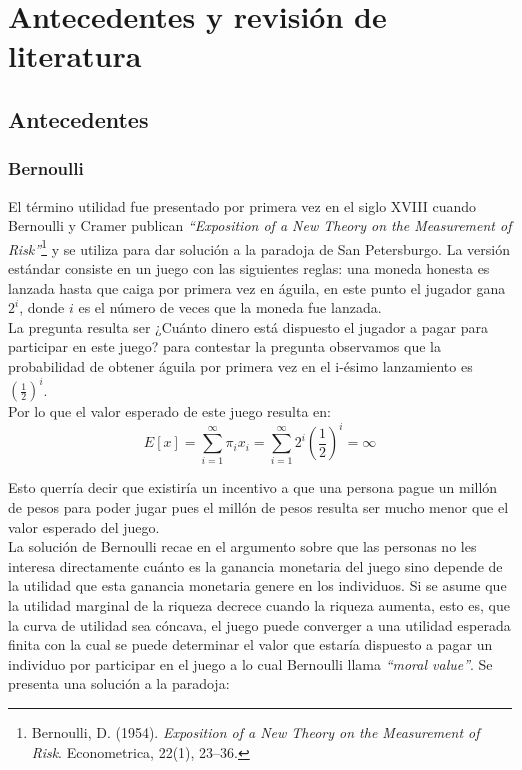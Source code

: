 \chapter{Antecedentes y revisión de literatura}


\newpage

\section{Antecedentes}

\subsection{Bernoulli}

El término utilidad fue presentado por primera vez en el siglo XVIII cuando Bernoulli y Cramer publican \textit{“Exposition of a New Theory on the Measurement of Risk”}\footnote{Bernoulli, D. (1954). \textit{Exposition of a New Theory on the Measurement of Risk}. Econometrica, 22(1), 23–36.} y se utiliza para dar solución a la paradoja de San Petersburgo. La versión estándar consiste en un juego con las siguientes reglas: una moneda honesta es lanzada hasta que caiga por primera vez en águila, en este punto el jugador gana $2^i$, donde $i$ es el número de veces que la moneda fue lanzada. \\

La pregunta resulta ser ¿Cuánto dinero está dispuesto el jugador a pagar para participar en este juego? para contestar la pregunta observamos que la probabilidad de obtener águila por primera vez en el i-ésimo lanzamiento es $(\frac{1}{2})^i$. \\

Por lo que el valor esperado de este juego resulta en: $$E[x] = \sum_{i = 1} ^{\infty} \pi_i x_i = \sum_{i = 1} ^{\infty} 2^i (\frac{1}{2})^i = \infty $$ 

Esto querría decir que existiría un incentivo a que una persona pague un millón de pesos para poder jugar pues el millón de pesos resulta ser mucho menor que el valor esperado del juego.\\

La solución de Bernoulli recae en el argumento sobre que las personas no les interesa directamente cuánto es la ganancia monetaria del juego sino depende de la utilidad que esta ganancia monetaria genere en los individuos. Si se asume que la utilidad marginal de la riqueza decrece cuando la riqueza aumenta, esto es, que la curva de utilidad sea cóncava, el juego puede converger a una utilidad esperada finita con la cual se puede determinar el valor que estaría dispuesto a pagar un individuo por participar en el juego a lo cual Bernoulli llama \textit{“moral value”}. Se presenta una solución a la paradoja: \\

